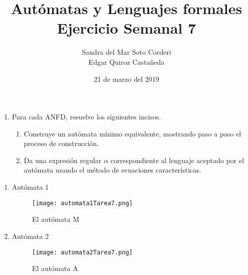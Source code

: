 \documentclass{article}
\begin{document}
    \title{
        Autómatas y Lenguajes formales \\
        Ejercicio Semanal 7
    }

    \author{
        Sandra del Mar Soto Corderi \\
        Edgar Quiroz Castañeda
    }

    \date{
        21 de marzo del 2019
    }
    
    \maketitle

    \begin{enumerate}
        \item {
            Para cada 	ANFD, resuelve los siguientes incisos.
            \begin{enumerate}
                \item Construye un autómata mínimo equivalente, mostrando paso 
                a paso el proceso de construcción.
                
                \item Da una expresión regular $\alpha$ correspondiente al 
                lenguaje aceptado por el autómata usando el método de ecuaciones
                características.
            \end{enumerate}
        }
       \end{enumerate}
    	\begin{enumerate}
    		\item {
    			Autómata 1
    			\begin{figure} [H]
    				\centering
    				\texttt{[image: automata1Tarea7.png]}
    				\caption{El autómata M}
    			\end{figure}
				}
    	
    	\item {
    		Autómata 2
    		\begin{figure} [H]
    			\centering
    			\texttt{[image: automata2Tarea7.png]}
    			\caption{El autómata A}
    		\end{figure}
    

    	}
    \end{enumerate}
\end{document}
